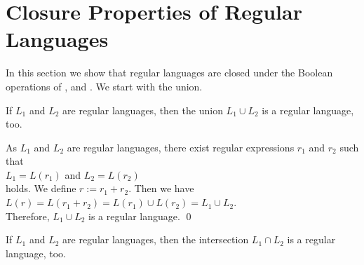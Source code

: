 \section{Closure Properties of Regular Languages}
In this section we show that regular languages are closed under the Boolean operations
of ,  and .  We start with the union.

\begin{Proposition} \label{prop:13}
  If $L_1$ and $L_2$ are regular languages, then the union $L_1 \cup L_2$ is a regular language, too.
\end{Proposition}

\proofEng
As $L_1$ and $L_2$ are regular languages, there exist regular expressions $r_1$ and $r_2$ such that
\\[0.2cm]
\hspace*{1.3cm}
$L_1 = L(r_1)$ \quad and \quad $L_2 = L(r_2)$
\\[0.2cm]
holds.  We define $r := r_1 + r_2$.  Then we have
\\[0.2cm]
\hspace*{1.3cm}
$L(r) = L(r_1 + r_2) = L(r_1) \cup L(r_2) = L_1 \cup L_2$.
\\[0.2cm]
Therefore,  $L_1 \cup L_2$ is a regular language. \qed

\begin{Proposition} \label{satz:schnitt}
  If  $L_1$ and $L_2$ are regular languages, then the intersection $L_1 \cap L_2$ is a regular language, too.
\end{Proposition}

